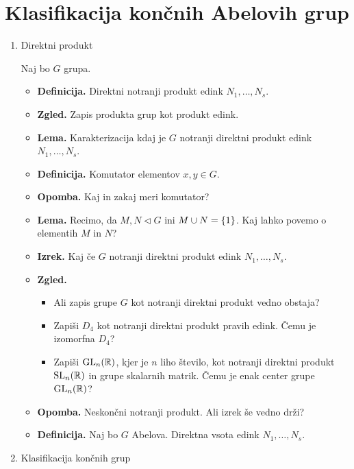 \section{Klasifikacija končnih Abelovih grup}
\begin{enumerate}
    \item Direktni produkt

    Naj bo \(G\) grupa.
    \begin{itemize}
        \item \textbf{Definicija.} Direktni notranji produkt edink \(N_1, \ldots, N_s\).
        \item \textbf{Zgled.} Zapis produkta grup kot produkt edink.
        \item \textbf{Lema.} Karakterizacija kdaj je \(G\) notranji direktni produkt edink \(N_1, \ldots, N_s\).
        \item \textbf{Definicija.} Komutator elementov \(x, y \in G\).
        \item \textbf{Opomba.} Kaj in zakaj meri komutator?
        \item \textbf{Lema.} Recimo, da \(M, N \triangleleft G\) ini \(M \cup N = \{1\}\). Kaj lahko povemo o elementih \(M\) in \(N\)?
        \item \textbf{Izrek.} Kaj če \(G\) notranji direktni produkt edink \(N_1, \ldots, N_s\). \todo{*}
        \item \textbf{Zgled.} \
        \begin{itemize}
            \item Ali zapis grupe \(G\) kot notranji direktni produkt vedno obstaja?
            \item Zapiši \(D_4\) kot notranji direktni produkt pravih edink. Čemu je izomorfna \(D_4\)?
            \item Zapiši \(\operatorname{GL}_n(\mathbb{R})\), kjer je \(n\) liho število, kot notranji direktni produkt \(\operatorname{SL}_n(\mathbb{R})\) in grupe skalarnih matrik. Čemu je enak center grupe \(\operatorname{GL}_n(\mathbb{R})\)?
        \end{itemize}
        \item \textbf{Opomba.} Neskončni notranji produkt. Ali izrek še vedno drži?
        \item \textbf{Definicija.} Naj bo \(G\) Abelova. Direktna vsota edink \(N_1, \ldots, N_s\).
    \end{itemize}

    \item Klasifikacija končnih grup
    

\end{enumerate}
